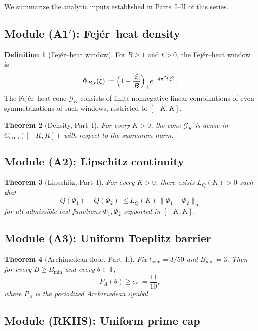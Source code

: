 \documentclass[11pt,a4paper]{article}
\newtheorem{theorem}{Theorem}[section]
\theoremstyle{definition}
\newtheorem{definition}[theorem]{Definition}
\newcommand{\TT}{\mathbb{T}}
\newcommand{\GG}{\mathcal{G}}
\begin{document}
We summarize the analytic inputs established in Parts~I--II of this series.

\subsection{Module (A1$'$): Fej\'er--heat density}

\begin{definition}[Fej\'er--heat window]
For $B \ge 1$ and $t > 0$, the Fej\'er--heat window is
\[
\Phi_{B,t}(\xi) := \Bigl(1 - \frac{|\xi|}{B}\Bigr)_+ e^{-4\pi^2 t\,\xi^2}.
\]
The Fej\'er--heat cone $\GG_K$ consists of finite nonnegative linear combinations of even symmetrizations of such windows, restricted to $[-K,K]$.
\end{definition}

\begin{theorem}[Density, Part~I]\label{thm:density}
For every $K > 0$, the cone $\GG_K$ is dense in $C^+_{\mathrm{even}}([-K,K])$ with respect to the supremum norm.
\end{theorem}

\subsection{Module (A2): Lipschitz continuity}

\begin{theorem}[Lipschitz, Part~I]\label{thm:lipschitz}
For every $K > 0$, there exists $L_Q(K) > 0$ such that
\[
|Q(\Phi_1) - Q(\Phi_2)| \le L_Q(K)\,\|\Phi_1 - \Phi_2\|_\infty
\]
for all admissible test functions $\Phi_1, \Phi_2$ supported in $[-K,K]$.
\end{theorem}

\subsection{Module (A3): Uniform Toeplitz barrier}

\begin{theorem}[Archimedean floor, Part~II]\label{thm:floor}
Fix $t_{\mathrm{sym}} = 3/50$ and $B_{\min} = 3$. Then for every $B \ge B_{\min}$ and every $\theta \in \TT$,
\[
P_A(\theta) \ge c_* := \frac{11}{10},
\]
where $P_A$ is the periodized Archimedean symbol.
\end{theorem}

\subsection{Module (RKHS): Uniform prime cap}
\end{document}

